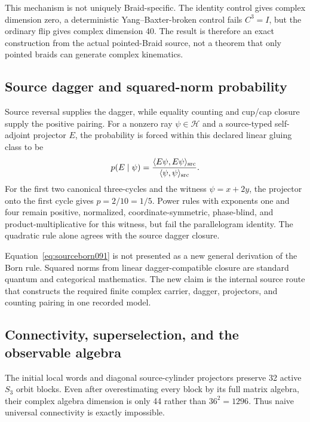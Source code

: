 \documentclass[11pt]{article}
\theoremstyle{definition}
\theoremstyle{remark}
\begin{document}
This mechanism is not uniquely Braid-specific. The identity control gives complex dimension zero, a deterministic Yang--Baxter-broken control fails $C^3=I$, but the ordinary flip gives complex dimension 40. The result is therefore an exact construction from the actual pointed-Braid source, not a theorem that only pointed braids can generate complex kinematics.

\subsection{Source dagger and squared-norm probability}

Source reversal supplies the dagger, while equality counting and cup/cap closure supply the positive pairing. For a nonzero ray $\psi\in\mathcal H$ and a source-typed self-adjoint projector $E$, the probability is forced within this declared linear gluing class to be
\begin{equation}
 p(E\mid\psi)
 =\frac{\langle E\psi,E\psi\rangle_{\rm src}}
 {\langle\psi,\psi\rangle_{\rm src}}.
 \label{eq:sourceborn091}
\end{equation}
For the first two canonical three-cycles and the witness $\psi=x+2y$, the projector onto the first cycle gives $p=2/10=1/5$. Power rules with exponents one and four remain positive, normalized, coordinate-symmetric, phase-blind, and product-multiplicative for this witness, but fail the parallelogram identity. The quadratic rule alone agrees with the source dagger closure.

Equation~\eqref{eq:sourceborn091} is not presented as a new general derivation of the Born rule. Squared norms from linear dagger-compatible closure are standard quantum and categorical mathematics. The new claim is the internal source route that constructs the required finite complex carrier, dagger, projectors, and counting pairing in one recorded model.

\subsection{Connectivity, superselection, and the observable algebra}

The initial local words and diagonal source-cylinder projectors preserve 32 active $S_3$ orbit blocks. Even after overestimating every block by its full matrix algebra, their complex algebra dimension is only 44 rather than $36^2=1296$. Thus naive universal connectivity is exactly impossible.
\end{document}
